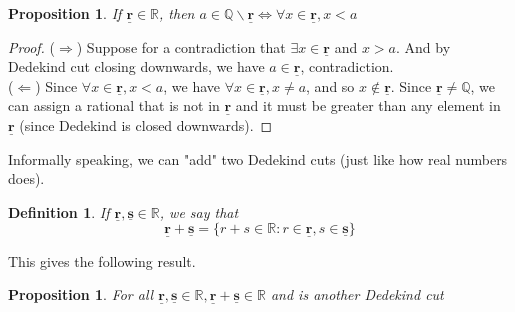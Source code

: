 \documentclass{book}
\newtheorem{definition}[theorem]{Definition}
\newtheorem{proposition}[theorem]{Proposition}
\begin{document}
\begin{proposition}
    If $\underline{\mathbf{r}} \in \mathbb{R}$, then $a \in \mathbb{Q} \backslash \underline{\mathbf{r}} \iff \forall x \in \underline{\mathbf{r}}, x < a$
\end{proposition}

\begin{proof}
    ($\Rightarrow$) Suppose for a contradiction that $\exists x \in \underline{\mathbf{r}}$ and $x > a$. And by Dedekind cut closing downwards, we have $a \in \underline{\mathbf{r}}$, contradiction. \\
    ($\Leftarrow$) Since $\forall x \in \underline{\mathbf{r}}, x < a$, we have $\forall x \in \underline{\mathbf{r}}, x \neq a$, and so $x \notin \underline{\mathbf{r}}$. Since $\underline{\mathbf{r}} \neq \mathbb{Q}$, we can assign a rational that is not in $\underline{\mathbf{r}}$ and it must be greater than any element in $\underline{\mathbf{r}}$ (since Dedekind is closed downwards).
\end{proof}

Informally speaking, we can "add" two Dedekind cuts (just like how real numbers does).

\begin{definition}
    If $\underline{\mathbf{r}}, \underline{\mathbf{s}} \in \mathbb{R}$, we say that
    $$\underline{\mathbf{r}} + \underline{\mathbf{s}} = \{r + s \in \mathbb{R} : r \in \underline{\mathbf{r}}, s \in \underline{\mathbf{s}}\}$$
\end{definition}

This gives the following result.

\begin{proposition} \label{Proposition 1.8.5}
    For all $\underline{\mathbf{r}}, \underline{\mathbf{s}} \in \mathbb{R}, \underline{\mathbf{r}} + \underline{\mathbf{s}} \in \mathbb{R}$ and is another Dedekind cut
\end{proposition}
\end{document}

